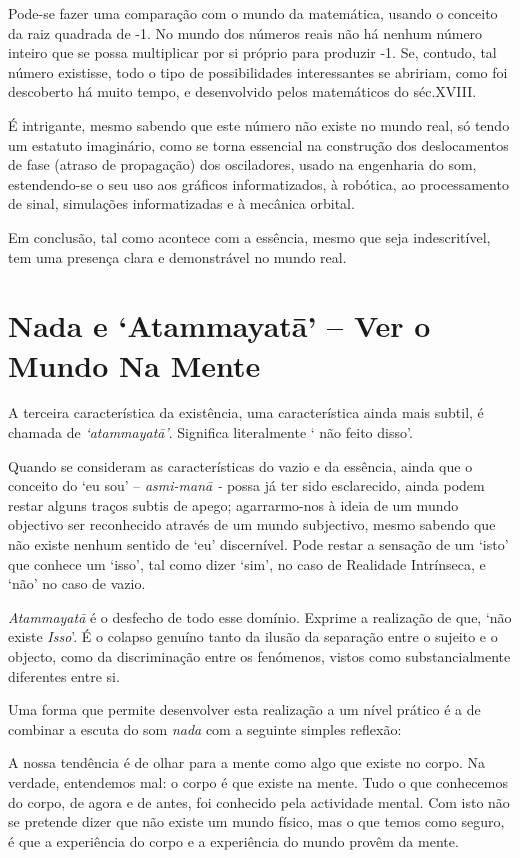 Pode-se fazer uma comparação com o mundo da matemática, usando o
conceito da raiz quadrada de -1. No mundo dos números reais não há
nenhum número inteiro que se possa multiplicar por si próprio para
produzir -1. Se, contudo, tal número existisse, todo o tipo de
possibilidades interessantes se abririam, como foi descoberto há muito
tempo, e desenvolvido pelos matemáticos do séc.XVIII.

É intrigante, mesmo sabendo que este número não existe no mundo real, só
tendo um estatuto imaginário, como se torna essencial na construção dos
deslocamentos de fase (atraso de propagação) dos osciladores, usado na
engenharia do som, estendendo-se o seu uso aos gráficos informatizados,
à robótica, ao processamento de sinal, simulações informatizadas e à
mecânica orbital.

Em conclusão, tal como acontece com a essência, mesmo que seja
indescritível, tem uma presença clara e demonstrável no mundo real.\cite{imaginary}

\section{Nada e `Atammayatā' -- Ver o Mundo Na Mente}

A terceira característica da existência, uma característica ainda mais
subtil, é chamada de \emph{`atammayatā'}. Significa literalmente ` não
feito disso'.

Quando se consideram as características do vazio e da essência, ainda
que o conceito do `eu sou' -- \emph{asmi-manā -} possa já ter sido
esclarecido, ainda podem restar alguns traços subtis de apego;
agarrarmo-nos à ideia de um mundo objectivo ser reconhecido através de
um mundo subjectivo, mesmo sabendo que não existe nenhum sentido de `eu'
discernível. Pode restar a sensação de um `isto' que conhece um `isso',
tal como dizer `sim', no caso de Realidade Intrínseca, e `não' no caso
de vazio.

\emph{Atammayatā} é o desfecho de todo esse domínio. Exprime a
realização de que, `não existe \emph{Isso}'. É o colapso genuíno tanto
da ilusão da separação entre o sujeito e o objecto, como da
discriminação entre os fenómenos, vistos como substancialmente
diferentes entre si.

Uma forma que permite desenvolver esta realização a um nível prático é a
de combinar a escuta do som \emph{nada} com a seguinte simples reflexão:

A nossa tendência é de olhar para a mente como algo que existe no corpo.
Na verdade, entendemos mal: o corpo é que existe na mente. Tudo o que
conhecemos do corpo, de agora e de antes, foi conhecido pela actividade
mental. Com isto não se pretende dizer que não existe um mundo físico,
mas o que temos como seguro, é que a experiência do corpo e a
experiência do mundo provêm da mente.

